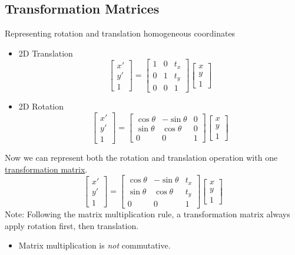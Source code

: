 \documentclass[10pt]{article}
\begin{document}
\subsection*{Transformation Matrices}
Representing rotation and translation homogeneous coordinates
\begin{itemize}
	\item 2D Translation
	\[\begin{bmatrix} x' \\ y' \\ 1 \end{bmatrix} = \begin{bmatrix} 1 & 0 & t_x \\ 0 & 1 & t_y \\ 0 & 0 & 1 \end{bmatrix} \begin{bmatrix} x \\ y \\ 1 \end{bmatrix}\]
	\item 2D Rotation
	\[\begin{bmatrix} x' \\ y' \\ 1 \end{bmatrix} = \begin{bmatrix} \cos \theta & -\sin \theta & 0 \\ \sin \theta & \cos \theta & 0 \\ 0 & 0 & 1 \end{bmatrix} \begin{bmatrix} x \\ y \\ 1 \end{bmatrix}\]
\end{itemize}
Now we can represent both the rotation and translation operation with one \underline{transformation matrix}.
\[\begin{bmatrix} x' \\ y' \\ 1 \end{bmatrix} = \begin{bmatrix} \cos \theta & -\sin \theta & t_x \\ \sin \theta & \cos \theta & t_y \\ 0 & 0 & 1 \end{bmatrix} \begin{bmatrix} x \\ y \\ 1 \end{bmatrix}\]
Note: Following the matrix multiplication rule, a transformation matrix always apply rotation first, then translation.
\begin{itemize}
	\item Matrix multiplication is \textit{not} commutative.
\end{itemize}
\end{document}
